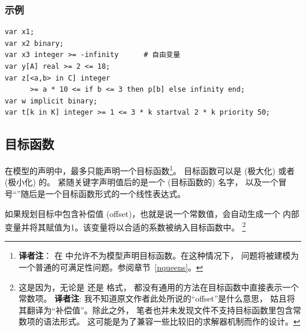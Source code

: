 \subsubsection{示例}
{\small
\begin{verbatim}
var x1;
var x2 binary;
var x3 integer >= -infinity      # 自由变量
var y[A] real >= 2 <= 18;
var z[<a,b> in C] integer
      >= a * 10 <= if b <= 3 then p[b] else infinity end;
var w implicit binary;
var t[k in K] integer >= 1 <= 3 * k startval 2 * k priority 50;
\end{verbatim}
}



\subsection{目标函数}
在模型的声明中，最多只能声明一个目标函数\footnote{\textbf{译者注}：
  在 \zimpl 中允许不为模型声明目标函数。在这种情况下，
  问题将被建模为一个普通的可满足性问题。参阅章节~\ref{nqueens}。}。
目标函数可以是 (极大化) 或者 (极小化) 的。
紧随关键字声明值后的是一个 (目标函数的) 名字，
以及一个冒号“\code{:}”随后是一个目标函数形式的一个线性表达式。

如果规划目标中包含补偿值 (offset)，也就是说一个常数值，\zimpl 会自动生成一个
内部变量并将其赋值为1。该变量将以合适的系数被纳入目标函数中。
\footnote{
  这是因为，无论是 \lpf 还是 \mps 格式，
  都没有通用的方法在目标函数中直接表示一个常数项。
  \textbf{译者注}: 我不知道原文作者此处所说的“offset”是什么意思，
  姑且将其翻译为“补偿值”。除此之外，
  笔者也并未发现\lpf 文件不支持目标函数里包含常数项的语法形式。
  这可能是为了兼容一些比较旧的求解器机制而作的设计。
}

